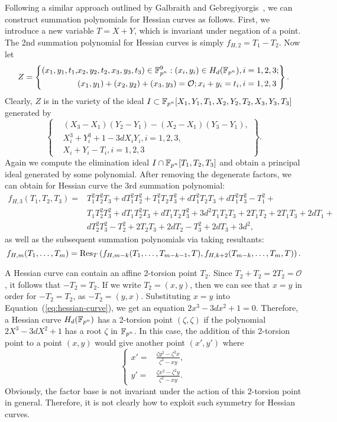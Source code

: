Following a similar approach outlined by Galbraith and
Gebregiyorgis~\cite{DBLP:conf/indocrypt/GalbraithG14}, we can
construct summation polynomials for Hessian curves as follows.
%
First, we introduce a new variable $T=X+Y$, which is invariant under
negation of a point.
%
The 2nd summation polynomial for Hessian curves is simply
$f_{H,2} = T_1 - T_2$.
%
Now let
\[ Z=\left\{\begin{aligned}
      (x_1,y_1,t_1,&x_2,y_2,t_2,x_3,y_3,t_3)\in\mathbb F_{p^n}^9:(x_i,y_i)\in H_d(\mathbb F_{p^n}),i=1,2,3; \\
      & (x_1,y_1)+(x_2,y_2)+(x_3,y_3)=\mathcal O; x_i+y_i=t_i,i=1,2,3
    \end{aligned} \right\}. \]
%
Clearly, $Z$ is in the variety of the ideal
$I\subset\mathbb F_{p^n}[X_1,Y_1,T_1,X_2,Y_2,T_2,X_3,Y_3,T_3]$ generated by
\[ \left\{\begin{aligned}
      &  (X_3 - X_1)(Y_2 - Y_1) - (X_2 - X_1)(Y_3 - Y_1), \\
      & X_i^3 + Y_i^3 + 1 - 3dX_iY_i,i=1,2,3, \\
      & X_i + Y_i - T_i,i=1,2,3
    \end{aligned}\right\}. \]
%
Again we compute the elimination ideal $I\cap\mathbb F_{p^n}[T_1,T_2,T_3]$ and
obtain a principal ideal generated by some polynomial.
%
After removing the degenerate factors, we can obtain for Hessian curve
the 3rd summation polynomial:
\begin{align*}
  f_{H,3}(T_1,T_2,T_3) = & T_1^2T_2^2T_3 + dT_1^2T_2^2 + T_1^2T_2T_3^2
                           + dT_1^2T_2T_3 + dT_1^2T_3^2 - T_1^2 + \\
                         & T_1T_2^2T_3^2 + dT_1T_2^2T_3 + dT_1T_2T_3^2
                           + 3d^2T_1T_2T_3 + 2T_1T_2 + 2T_1T_3 + 2dT_1
                           + \\
                         & dT_2^2T_3^2 - T_2^2 + 2T_2T_3 + 2dT_2 - T_3^2 + 2dT_3 + 3d^2,
\end{align*}
%
as well as the subsequent summation polynomials via taking resultants:
\[ f_{H,m}(T_1,\ldots,T_m) =
  \operatorname{Res}_T\left(f_{H,m-k}(T_1,\ldots,T_{m-k-1},T),f_{H,k+2}(T_{m-k},\ldots,T_m,T)\right). \]

A Hessian curve can contain an affine 2-torsion point $T_2$.
%
Since $T_2+T_2=2T_2=\mathcal O$, it follows that $-T_2=T_2$.
%
If we write $T_2=(x,y)$, then we can see that $x=y$ in order for
$-T_2=T_2$, as $-T_2=(y,x)$.
%
Substituting $x=y$ into Equation~(\ref{eq:hessian-curve}), we get an
equation $2x^3-3dx^2+1=0$.
%
Therefore, a Hessian curve $H_d(\mathbb F_{p^n})$ has a 2-torsion point
$(\zeta,\zeta)$ if the polynomial $2X^3 - 3dX^2 + 1$ has a root
$\zeta$ in $\mathbb F_{p^n}$.
%
In this case, the addition of this 2-torsion point to a point $(x,y)$
would give another point $(x',y')$ where
\[ \left\{\begin{aligned}
x' = & \frac{\zeta y^2 - \zeta^2x}{\zeta^2 - xy}, \\
y' = & \frac{\zeta x^2 - \zeta^2y}{\zeta^2 - xy}.
\end{aligned}\right. \]
%
Obviously, the factor base is not invariant under the action of this
2-torsion point in general.
%
Therefore, it is not clearly how to exploit such symmetry for Hessian
curves.

